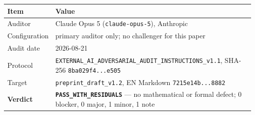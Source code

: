 \documentclass[
  9pt,
  a4paper,
]{article}
\newcounter{none} %
\begin{document}
{\def\LTcaptype{none} %
\begin{longtable}[]{@{}ll@{}}
\toprule\noalign{}
Item & Value \\
\midrule\noalign{}
\endhead
\bottomrule\noalign{}
\endlastfoot
Auditor & Claude Opus 5 (\texttt{claude-opus-5}), Anthropic \\
Configuration & primary auditor only; no challenger for this paper \\
Audit date & 2026-08-21 \\
Protocol &
\texttt{EXTERNAL\_AI\_ADVERSARIAL\_AUDIT\_INSTRUCTIONS\_v1.1}, SHA-256
\texttt{8ba029f4...e505} \\
Target & \texttt{preprint\_draft\_v1.2}, EN Markdown
\texttt{7215e14b...8882} \\
\textbf{Verdict} & \textbf{\texttt{PASS\_WITH\_RESIDUALS}} --- no
mathematical or formal defect; 0 blocker, 0 major, 1 minor, 1 note \\
\end{longtable}
}
\end{document}

